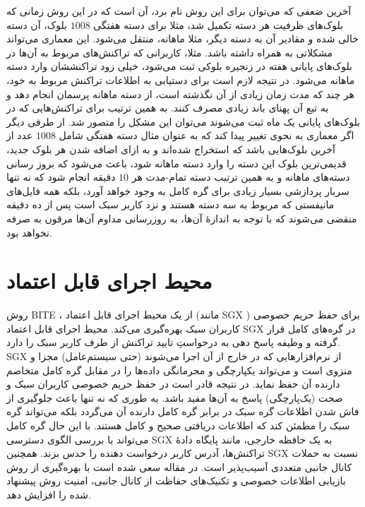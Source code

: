 آخرین ضعفی که می‌توان برای این روش \cite{Qin2019} نام برد، آن است که در این روش زمانی که بلوک‌های ظرفیت هر دسته تکمیل شد، مثلا برای دسته هفتگی $1008$ بلوک، آن دسته خالی شده و مقادیر آن به دسته دیگر، مثلا ماهانه، منتقل می‌شود. این معماری می‌تواند مشکلاتی به همراه داشته باشد. مثلا، کاربرانی که تراکنش‌های مربوط به آن‌ها در بلوک‌های پایانی هفته در زنجیره بلوکی ثبت می‌شود، خیلی زود تراکنششان وارد دسته ماهانه می‌شود. در نتیجه لازم است برای دستیابی به اطلاعات تراکنش مربوط به خود، هر چند که مدت زمان زیادی از آن نگذشته است، از دسته ماهانه پرسمان انجام دهد و به تبع آن پهنای باند زیادی مصرف کنند. به همین ترتیب برای تراکنش‌هایی که در بلوک‌های پایانی یک ماه ثبت می‌شوند می‌توان این مشکل را متصور شد. از طرفی دیگر اگر معماری به نحوی تغییر پیدا کند که به عنوان مثال دسته هفتگی شامل $1008$ عدد از آخرین بلوک‌هایی باشد که استخراج شده‌اند و به ازای اضافه شدن هر بلوک جدید، قدیمی‌ترین بلوک این دسته را وارد دسته ماهانه شود، باعث می‌شود که بروز رسانی دسته‌های ماهانه و به همین ترتیب دسته تمام-مدت هر $10$ دقیقه انجام شود که نه تنها سربار پردازشی بسیار زیادی برای گره کامل به وجود خواهد آورد، بلکه همه فایل‌های مانیفستی که مربوط به سه دسته هستند و نزد کاربر سبک است پس از ده دقیقه منقضی می‌شوند که با توجه به اندازه‌ٔ آن‌ها، به روزرسانی مداوم آن‌ها مرقون به صرفه نخواهد بود.

\section{محیط اجرای قابل اعتماد}
\label{SGX}

روش BITE
\cite{Matetic2019}
، از یک محیط اجرای قابل اعتماد (مانند 
SGX
\cite{SGX})
برای حفظ حریم خصوصی کاربران سبک بهره‌گیری می‌کند. 
محیط اجرای قابل اعتماد SGX در گره‌های کامل قرار گرفته و وظیفه پاسخ دهی به درخواستِ تایید تراکنش از طرف کاربر سبک را دارد. SGX از نرم‌افزارهایی که در خارج از آن اجرا می‌شوند (حتی سیستم‌عامل) مجزا و منزوی است و می‌تواند یکپارچگی و محرمانگی داده‌ها را در مقابل گره کامل متخاصم دارنده آن حفظ نماید. در نتیجه قادر است در حفظ حریم خصوصی کاربران سبک و صحت (یک‌پارچگی) پاسخ‌ به آن‌‌ها مفید باشد. به طوری که نه تنها باعث جلوگیری از فاش شدن اطلاعات گره سبک در برابر گره کامل دارنده آن می‌گردد بلکه می‌تواند گره سبک را مطمئن کند که اطلاعات دریافتی صحیح و کامل هستند. با این حال گره کامل می‌تواند با بررسی الگوی دسترسی SGX به یک حافظه خارجی،‌ مانند پایگاه‌ دادهٔ‌ تراکنش‌ها، آدرس کاربر درخواست دهنده را حدس بزند. همچنین SGX نسبت به حملات کانال جانبی متعددی آسیب‌پذیر است. در مقاله \cite{Matetic2019} سعی شده است با بهره‌گیری از روش بازیابی اطلاعات خصوصی و تکنیک‌های حفاظت از کانال جانبی، امنیت روش پیشنهاد شده را افزایش دهد.

